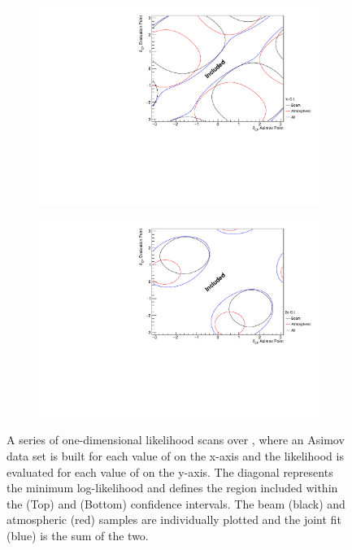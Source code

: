 \begin{figure}[h]
  \begin{subfigure}[t]{1.0\textwidth}
    \includegraphics[width=\textwidth, trim={0mm 0mm 0mm 0mm}, clip,page=1]{Figures/OA/DCP_Scans_1Sig.pdf}
  \end{subfigure}
  \begin{subfigure}[t]{1.0\textwidth}
    \includegraphics[width=\textwidth, trim={0mm 0mm 0mm 0mm}, clip,page=1]{Figures/OA/DCP_Scans_2Sig.pdf}
  \end{subfigure}
  \caption{A series of one-dimensional likelihood scans over , where an Asimov data set is built for each value of  on the x-axis and the likelihood is evaluated for each value of  on the y-axis. The diagonal represents the minimum log-likelihood and defines the region included within the \quickmath{1\sigma} (Top) and \quickmath{2\sigma} (Bottom) confidence intervals. The beam (black) and atmospheric (red) samples are individually plotted and the joint fit (blue) is the sum of the two.}
  \label{fig:OscillationAnalysis_AsimovEval_DCP}
\end{figure}

